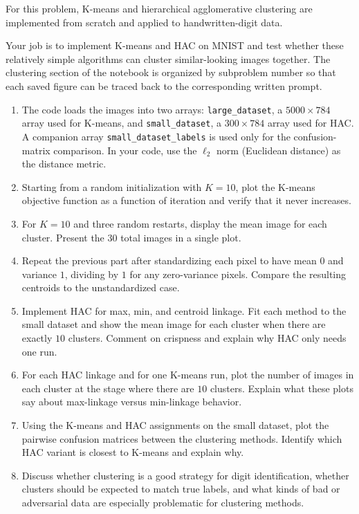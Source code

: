 \documentclass[submit]{harvardml}
\begin{document}
\begin{problem}
For this problem, K-means and hierarchical agglomerative clustering are implemented from scratch and applied to handwritten-digit data.

Your job is to implement K-means and HAC on MNIST and test whether these relatively simple algorithms can cluster similar-looking images together. The clustering section of the notebook is organized by subproblem number so that each saved figure can be traced back to the corresponding written prompt.

\begin{enumerate}[leftmargin=*]
    \item The code loads the images into two arrays: \texttt{large\_dataset}, a \(5000 \times 784\) array used for K-means, and \texttt{small\_dataset}, a \(300 \times 784\) array used for HAC. A companion array \texttt{small\_dataset\_labels} is used only for the confusion-matrix comparison. In your code, use the \(\ell_2\) norm (Euclidean distance) as the distance metric.
    \item Starting from a random initialization with \(K=10\), plot the K-means objective function as a function of iteration and verify that it never increases.
    \item For \(K=10\) and three random restarts, display the mean image for each cluster. Present the \(30\) total images in a single plot.
    \item Repeat the previous part after standardizing each pixel to have mean \(0\) and variance \(1\), dividing by \(1\) for any zero-variance pixels. Compare the resulting centroids to the unstandardized case.
    \item Implement HAC for max, min, and centroid linkage. Fit each method to the small dataset and show the mean image for each cluster when there are exactly \(10\) clusters. Comment on crispness and explain why HAC only needs one run.
    \item For each HAC linkage and for one K-means run, plot the number of images in each cluster at the stage where there are \(10\) clusters. Explain what these plots say about max-linkage versus min-linkage behavior.
    \item Using the K-means and HAC assignments on the small dataset, plot the pairwise confusion matrices between the clustering methods. Identify which HAC variant is closest to K-means and explain why.
    \item Discuss whether clustering is a good strategy for digit identification, whether clusters should be expected to match true labels, and what kinds of bad or adversarial data are especially problematic for clustering methods.
\end{enumerate}
\end{problem}
\end{document}

